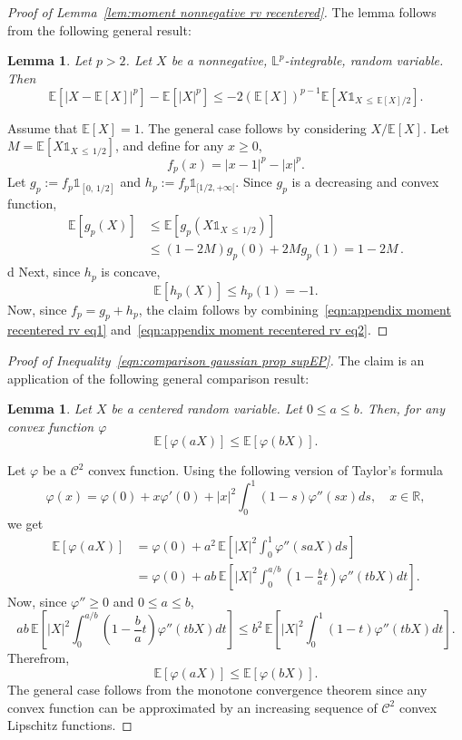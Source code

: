 \documentclass[10pt]{amsart}
\newtheorem{lemm}[theo]{Lemma}\newtheorem{prop}[theo]{Proposition}\newtheorem{coro}[theo]{Corollary}\newtheorem{conj}[theo]{Conjecture}
\theoremstyle{definition}\newtheorem{defi}[theo]{Definition}\newtheorem{rema}[theo]{Remark}\newtheorem{exam}[theo]{Example}\newtheorem{exem}[theo]{Example}\newtheorem{nota}[theo]{Notation}
\newcommand{\bE}{\mathbb{E}}
\newcommand{\bL}{\mathbb{L}}
\newcommand{\bR}{\mathbb{R}}
\newcommand{\cC}{\mathcal{C}}
\newcommand{\ind}{\mathds{1}}
\begin{document}
\begin{proof}[Proof of Lemma~\ref{lem:moment nonnegative rv recentered}]
The lemma follows from the following general result:
\begin{lemm}
Let $p>2$. Let $X$ be a nonnegative, $\bL^p$-integrable, random variable. Then
\[
\bE[|X-\bE[X]|^p]-\bE[|X|^p]\leq -2(\bE[X])^{p-1}\bE[X\ind_{X\,\leq\,\bE[X]/2}].
\]
\end{lemm}

Assume that $\bE[X]=1$. The general case follows by considering $X/\bE[X]$. Let $M=\bE[X\ind_{X\,\leq\,1/2}]$, and define for any $x\geq 0$,
\[
f_p(x)=|x-1|^p-|x|^p.
\]
Let $g_p:=f_p\ind_{[0,\,1/2]}$ and $h_p:=f_p\ind_{[1/2, +\infty[}$. Since $g_p$ is a decreasing and convex function,
\begin{equation}\label{eqn:appendix moment recentered rv eq1}
\begin{aligned}
\bE[g_p(X)]&\leq\bE\left[g_p\left(X\ind_{X\,\leq\,1/2}\right)\right]\\
&\leq (1-2M) g_p(0)+2Mg_p(1)=1-2M\,. 
\end{aligned}
\end{equation}d
Next, since $h_p$ is concave,
\begin{equation}\label{eqn:appendix moment recentered rv eq2}
\bE\left[h_p(X)\right]\leq h_p(1)=-1.
\end{equation}
Now, since $f_p=g_p+h_p$, the claim follows by combining~\eqref{eqn:appendix moment recentered rv eq1} and~\eqref{eqn:appendix moment recentered rv eq2}.
\end{proof}

\begin{proof}[Proof of Inequality~\eqref{eqn:comparison gaussian prop supEP}]
The claim is an application of the following general comparison result:
\begin{lemm}
Let $X$ be a centered random variable. Let $0\leq a \leq b$. Then, for any convex function $\varphi$
\[
\bE\left[\varphi(aX)\right]\leq \bE\left[\varphi(bX)\right].
\]
\end{lemm}

Let $\varphi$ be a $\cC^2$ convex function. Using the following version of Taylor's formula
\[
\varphi(x)=\varphi(0)+x\varphi'(0)+|x|^2\int_0^1 (1-s)\varphi''(sx)ds,\quad x\in\bR,
\]
we get
\begin{align*}
\bE\left[\varphi(aX)\right] &= \varphi(0)+a^2\,\bE\left[|X|^2\int_0^1\varphi''(saX)ds\right]\\
&=\varphi(0)+ab\,\bE\left[|X|^2\int_0^{a/b}\left(1-\frac ba t\right)\varphi''(tbX)dt\right].
\end{align*}
Now, since $\varphi''\geq 0$ and $0\leq a\leq b$,
\[
ab\,\bE\left[|X|^2\int_0^{a/b}\left(1-\frac ba t\right)\varphi''(tbX)dt\right]\leq b^2\,\bE\left[|X|^2\int_0^{1}\left(1- t\right)\varphi''(tbX)dt\right].
\]
Therefrom,
\[
\bE[\varphi(aX)]\leq\bE[\varphi(bX)].
\]
The general case follows from the monotone convergence theorem since any convex function can be approximated by an increasing sequence of $\cC^2$ convex Lipschitz functions.
\end{proof}
\end{document}
